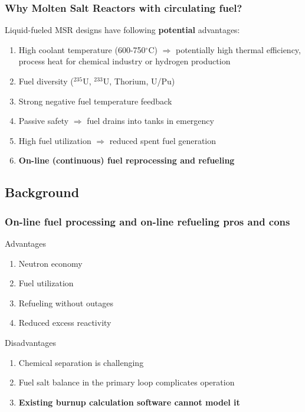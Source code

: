 \begin{frame}
\frametitle{Why Molten Salt Reactors with circulating fuel?}
\begin{block}{Liquid-fueled \gls{MSR} designs have following \textbf{potential} advantages:}
	\begin{enumerate}
		\itemsep1em
		\item High coolant temperature (600-750$^{\circ}$C) 
		$\Rightarrow$ potentially high thermal efficiency, process 
		heat for chemical industry or hydrogen production
		\item Fuel diversity ($^{235}$U, $^{233}$U, Thorium, U/Pu)
		\item Strong negative fuel temperature feedback 
		\item Passive safety $\Rightarrow$ fuel drains into tanks 
		in emergency
		\item High fuel utilization $\Rightarrow$ reduced spent fuel 
		generation
		\item<2> \textbf{On-line (continuous) fuel reprocessing and refueling}
	\end{enumerate}
\end{block}

\end{frame}


\subsection{Background}

\begin{frame}
\frametitle{On-line fuel processing and on-line refueling pros and 
cons}
\begin{block}{Advantages}
	\begin{enumerate}
		\item Neutron economy
		\item Fuel utilization
		\item Refueling without outages
		\item Reduced excess reactivity
	\end{enumerate}
\end{block}

\begin{block}{Disadvantages}
	\begin{enumerate}
		\item Chemical separation is challenging
		\item Fuel salt balance in the primary loop complicates operation
		\item \textbf{Existing burnup calculation software cannot model it}
	\end{enumerate}
\end{block}

\end{frame}


